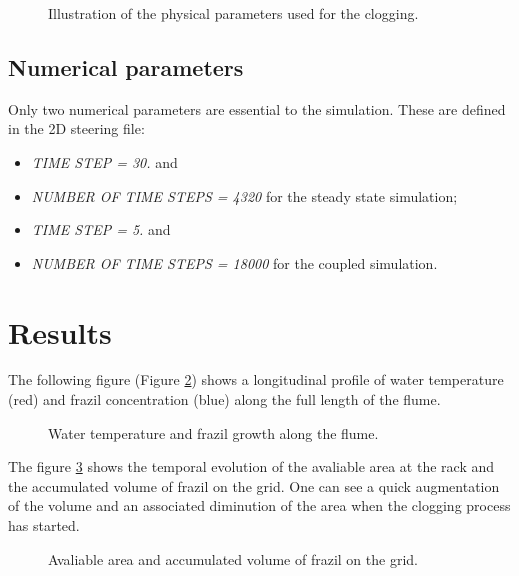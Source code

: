 \begin{figure}[H]
    \begin{center}
    \end{center}
    \caption{Illustration of the physical parameters used for the clogging.}
    \label{fig:clog_param}
\end{figure}

\subsection{Numerical parameters}
Only two numerical parameters are essential to the simulation. These are defined in the \telemac2D steering file:
\begin{itemize}
    \item\textit{TIME STEP = 30.} and
    \item\textit{NUMBER OF TIME STEPS = 4320} for the steady state simulation;
    \item\textit{TIME STEP = 5.} and
    \item\textit{NUMBER OF TIME STEPS = 18000} for the coupled simulation.
\end{itemize}

\section{Results}
The following figure (Figure \ref{fig:clogging_temp}) shows a longitudinal profile of water temperature (red) and frazil concentration (blue) along the full length of the flume.

\begin{figure}[H]
    \begin{center}
    \end{center}
    \caption{Water temperature and frazil growth along the flume.}
    \label{fig:clogging_temp}
\end{figure}

The figure \ref{fig:clog} shows the temporal evolution of the avaliable area at the rack and the accumulated volume of frazil on the grid. One can see a quick augmentation of the volume and an associated diminution of the area when the clogging process has started.

\begin{figure}[H]
    \begin{center}
    \end{center}
    \caption{Avaliable area and accumulated volume of frazil on the grid.}
    \label{fig:clog}
\end{figure}

